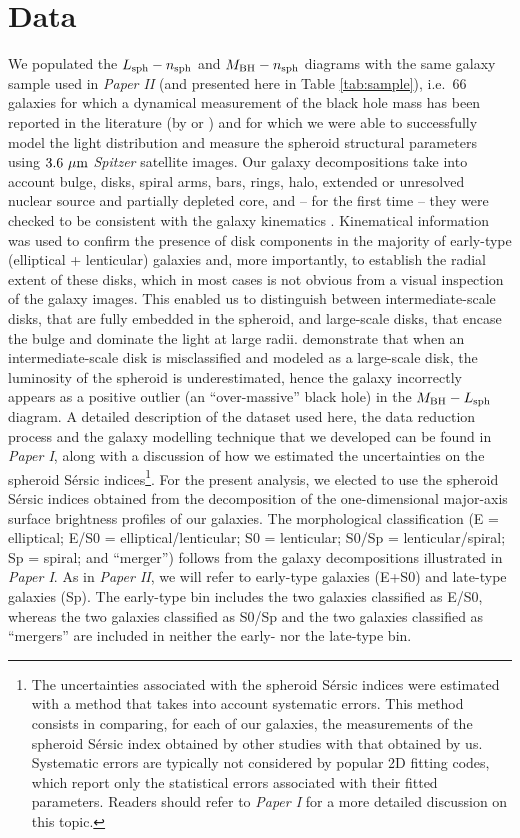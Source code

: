 \documentclass[preprint2]{emulateapj}
\begin{document}
\section{Data}
We populated the $L_{\rm sph} - n_{\rm sph}$ and $M_{\rm BH} - n_{\rm sph}$ diagrams 
with the same galaxy sample used in \emph{Paper II} (and presented here in Table \ref{tab:sample}), 
i.e.~66 galaxies for which a dynamical measurement of the black hole mass has been reported in the literature 
(by \citealt{grahamscott2013} or \citealt{rusli2013}) 
and for which we were able to successfully model the light distribution and measure the spheroid structural parameters 
using $3.6\rm~\mu m$ \emph{Spitzer} satellite images. 
Our galaxy decompositions take into account bulge, disks, spiral arms, bars, rings, halo, 
extended or unresolved nuclear source and partially depleted core, 
and -- for the first time -- they were checked to be consistent with the galaxy kinematics 
\citep{atlas3dIII,scott2014,arnold2014}. 
Kinematical information was used to confirm the presence of disk components 
in the majority of early-type (elliptical + lenticular) galaxies and, more importantly,  
to establish the radial extent of these disks, 
which in most cases is not obvious from a visual inspection of the galaxy images. 
This enabled us to distinguish between intermediate-scale disks, 
that are fully embedded in the spheroid,  
and large-scale disks, that encase the bulge and dominate the light at large radii.  
\cite{ellicular} demonstrate that when an intermediate-scale disk is misclassified and modeled as a large-scale disk, 
the luminosity of the spheroid is underestimated, 
hence the galaxy incorrectly appears as a positive outlier (an ``over-massive'' black hole) in the $M_{\rm BH} - L_{\rm sph}$ diagram. 
A detailed description of the dataset used here, the data reduction process and the galaxy modelling technique that we developed 
can be found in \emph{Paper I}, 
along with a discussion of how we estimated the uncertainties on the spheroid S\'ersic indices\footnote{The uncertainties associated with 
the spheroid S\'ersic indices were estimated with a method that takes into account systematic errors. 
This method consists in comparing, for each of our galaxies, the measurements of the spheroid S\'ersic index obtained by other studies 
with that obtained by us. 
Systematic errors are typically not considered by popular 2D fitting codes, which report only the statistical errors 
associated with their fitted parameters. 
Readers should refer to \emph{Paper I} for a more detailed discussion on this topic. }. 
For the present analysis, we elected to use the spheroid S\'ersic indices obtained from the decomposition of the one-dimensional 
major-axis surface brightness profiles of our galaxies.  
The morphological classification (E = elliptical; E/S0 = elliptical/lenticular; S0 = lenticular; 
S0/Sp = lenticular/spiral; Sp = spiral; and ``merger'') follows from the galaxy decompositions illustrated in \emph{Paper I}. 
As in \emph{Paper II}, we will refer to early-type galaxies (E+S0) and late-type galaxies (Sp). 
The early-type bin includes the two galaxies classified as E/S0, 
whereas the two galaxies classified as S0/Sp and the two galaxies classified as ``mergers'' are included in neither the early- nor the late-type bin.
\end{document}
